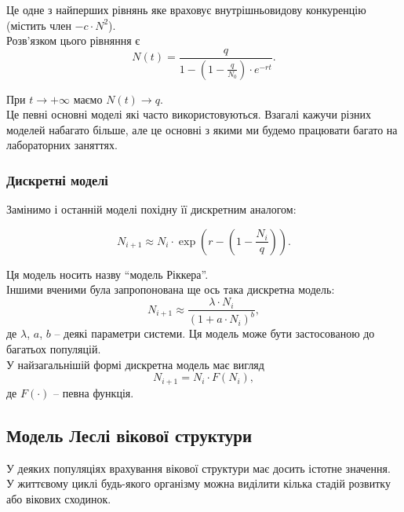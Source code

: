 Це одне з найперших рівнянь яке враховує внутрішньовидову конкуренцію (містить член $-c \cdot N^2$). \\

Розв'язком цього рівняння є
\begin{equation}
    N(t) = \frac{q}{1 - \left( 1 - \frac{q}{N_0} \right) \cdot e^{-rt}}. 
\end{equation}

При $t \to + \infty$ маємо $N(t) \to q$. \\

Це певні основні моделі які часто використовуються. Взагалі кажучи різних моделей набагато більше, але це основні з якими ми будемо працювати багато на лабораторних заняттях.

\subsubsection{Дискретні моделі}

Замінимо і останній моделі похідну її дискретним аналогом:

\begin{equation}
    N_{i + 1} \approx N_i \cdot \exp \left( r - \left( 1 - \frac{N_i}{q} \right) \right).
\end{equation}

Ця модель носить назву ``модель Ріккера''. \\

Іншими вченими була запропонована ще ось така дискретна модель:
\begin{equation}
    N_{i + 1} \approx \frac{\lambda \cdot N_i}{(1 + a \cdot N_i)^b},
\end{equation}
де $\lambda$, $a$, $b$ -- деякі параметри системи. Ця модель може бути застосованою до багатьох популяцій. \\

У найзагальнішій формі дискретна модель має вигляд
\begin{equation}
    N_{i + 1} = N_i \cdot F(N_i),
\end{equation}
де $F(\cdot)$ -- певна функція.

\subsection{Модель Леслі вікової структури}

У деяких популяціях врахування вікової структури має досить істотне значення. У життєвому циклі будь-якого організму можна виділити кілька стадій розвитку або вікових сходинок. \\

